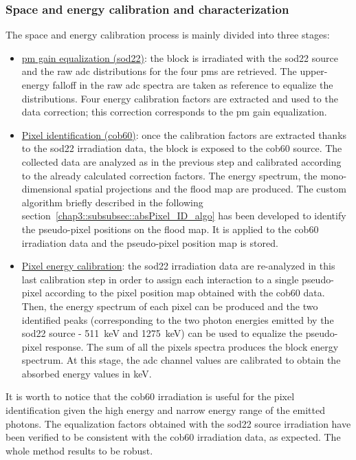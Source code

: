 \subsubsection{Space and energy calibration and characterization}\label{chap3::subsubsec::absSpaceEnMethod}

The space and energy calibration process is mainly divided into three stages:
\begin{itemize}
\item \underline{\gls{pm} gain equalization (\gls{sod22})}: the block is irradiated with the \gls{sod22} source and the raw \gls{adc} distributions for the four \glspl{pm} are retrieved. The upper-energy falloff in the raw \gls{adc} spectra are taken as reference to equalize the distributions. Four energy calibration factors are extracted and used to the data correction; this correction corresponds to the \gls{pm} gain equalization.

\item \underline{Pixel identification (\gls{cob60})}: once the calibration factors are extracted thanks to the \gls{sod22} irradiation data, the block is exposed to the \gls{cob60} source. The collected data are analyzed as in the previous step and calibrated according to the already calculated correction factors. The energy spectrum, the mono-dimensional spatial projections and the flood map are produced. The custom algorithm briefly described in the following section~\ref{chap3::subsubsec::absPixel_ID_algo} has been developed to identify the pseudo-pixel positions on the flood map. It is applied to the \gls{cob60} irradiation data and the pseudo-pixel position map is stored. 

\item \underline{Pixel energy calibration}: the \gls{sod22} irradiation data are re-analyzed in this last calibration step in order to assign each interaction to a single pseudo-pixel according to the pixel position map obtained with the \gls{cob60} data. Then, the energy spectrum of each pixel can be produced and the two identified peaks (corresponding to the two photon energies emitted by the \gls{sod22} source - 511~keV and 1275~keV) can be used to equalize the pseudo-pixel response. The sum of all the pixels spectra produces the block energy spectrum. At this stage, the \gls{adc} channel values are calibrated to obtain the absorbed energy values in keV.     
\end{itemize}

It is worth to notice that the \gls{cob60} irradiation is useful for the pixel identification given the high energy and narrow energy range of the emitted photons. The equalization factors obtained with the \gls{sod22} source irradiation have been verified to be consistent with the \gls{cob60} irradiation data, as expected. The whole method results to be robust.


